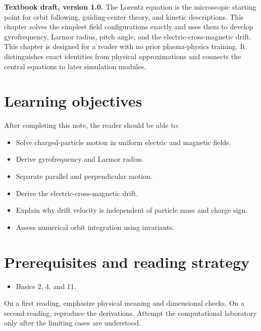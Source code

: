 \documentclass[11pt]{article}
\begin{document}

\begin{overviewbox}
\textbf{Textbook draft, version 1.0.} The Lorentz equation is the microscopic starting point for orbit following, guiding-center theory, and kinetic descriptions. This chapter solves the simplest field configurations exactly and uses them to develop gyrofrequency, Larmor radius, pitch angle, and the electric-cross-magnetic drift. This chapter is designed for a reader with no prior plasma-physics training. It distinguishes exact identities from physical approximations and connects the central equations to later simulation modules.
\end{overviewbox}

\ProjectTOC

\section{Learning objectives}
After completing this note, the reader should be able to:
\begin{itemize}[leftmargin=1.6em]
\item Solve charged-particle motion in uniform electric and magnetic fields.
\item Derive gyrofrequency and Larmor radius.
\item Separate parallel and perpendicular motion.
\item Derive the electric-cross-magnetic drift.
\item Explain why drift velocity is independent of particle mass and charge sign.
\item Assess numerical orbit integration using invariants.
\end{itemize}

\section{Prerequisites and reading strategy}
\begin{itemize}[leftmargin=1.6em]
\item Basics 2, 4, and 11.
\end{itemize}
On a first reading, emphasize physical meaning and dimensional checks. On a second reading, reproduce the derivations. Attempt the computational laboratory only after the limiting cases are understood.
\end{document}
